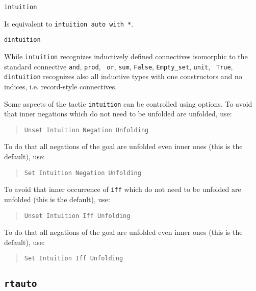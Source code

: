 \begin{coq_example*}
\begin{Variants}
\item {\tt intuition}

  Is equivalent to {\tt intuition auto with *}.

\item {\tt dintuition}

  While {\tt intuition} recognizes inductively defined connectives
  isomorphic to the standard connective {\tt and}, {\tt prod}, {\tt
    or}, {\tt sum}, {\tt False}, {\tt Empty\_set}, {\tt unit}, {\tt
    True}, {\tt dintuition} recognizes also all inductive types with
  one constructors and no indices, i.e. record-style connectives.

\end{Variants}


Some aspects of the tactic {\tt intuition} can be
controlled using options. To avoid that inner negations which do not
need to be unfolded are unfolded, use:

\begin{quote}
{\tt Unset Intuition Negation Unfolding}
\end{quote}

To do that all negations of the goal are unfolded even inner ones
(this is the default), use:

\begin{quote}
{\tt Set Intuition Negation Unfolding}
\end{quote}

To avoid that inner occurrence of {\tt iff} which do not need to be
unfolded are unfolded (this is the default), use:

\begin{quote}
{\tt Unset Intuition Iff Unfolding}
\end{quote}

To do that all negations of the goal are unfolded even inner ones
(this is the default), use:

\begin{quote}
{\tt Set Intuition Iff Unfolding}
\end{quote}



\subsection{\tt rtauto}
\label{rtauto}


\end{coq_example*}
